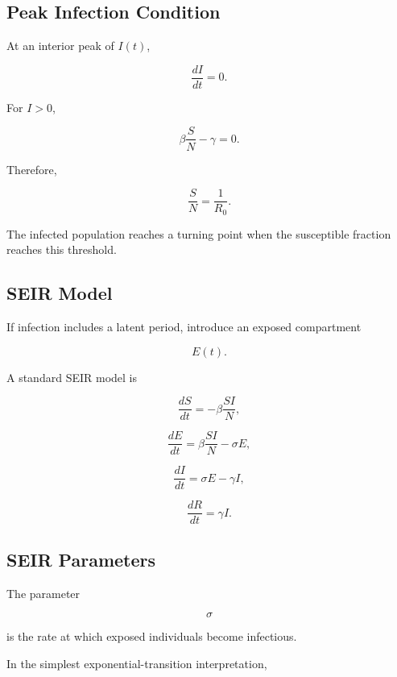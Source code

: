 \subsection{Peak Infection Condition}
\label{subsec:sir-peak-infection}

At an interior peak of \(I(t)\),

\[
\frac{dI}{dt}=0.
\]

For \(I>0\),

\[
\beta\frac{S}{N}
-
\gamma
=
0.
\]

Therefore,

\[
\boxed{
\frac{S}{N}
=
\frac{1}{R_0}.
}
\]

The infected population reaches a turning point when the susceptible
fraction reaches this threshold.

\subsection{SEIR Model}
\label{subsec:seir-model}

If infection includes a latent period, introduce an exposed compartment

\[
\boxed{
E(t).
}
\]

A standard SEIR model is

\[
\boxed{
\frac{dS}{dt}
=
-\beta\frac{SI}{N},
}
\]

\[
\boxed{
\frac{dE}{dt}
=
\beta\frac{SI}{N}
-
\sigma E,
}
\]

\[
\boxed{
\frac{dI}{dt}
=
\sigma E-\gamma I,
}
\]

\[
\boxed{
\frac{dR}{dt}
=
\gamma I.
}
\]

\subsection{SEIR Parameters}
\label{subsec:seir-parameters}

The parameter

\[
\sigma
\]

is the rate at which exposed individuals become infectious.

In the simplest exponential-transition interpretation,

